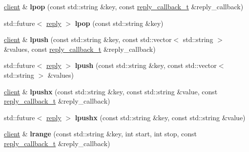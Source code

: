 \begin{DoxyCompactItemize}
\item 
\mbox{\label{classcpp__redis_1_1client_ad4060807b9b9aa330ad11dedd69e80b8}} 
\hyperlink{classcpp__redis_1_1client}{client} \& {\bfseries lpop} (const std\+::string \&key, const \hyperlink{classcpp__redis_1_1client_a061a1140d36d2eaeda82b09a0bb3f9f2}{reply\+\_\+callback\+\_\+t} \&reply\+\_\+callback)
\item 
\mbox{\label{classcpp__redis_1_1client_ab6ebbc7b2e6f43f2b5607a4b5471694e}} 
std\+::future$<$ \hyperlink{classcpp__redis_1_1reply}{reply} $>$ {\bfseries lpop} (const std\+::string \&key)
\item 
\mbox{\label{classcpp__redis_1_1client_a0dd04ea38709dd51ae5f39de62d01c70}} 
\hyperlink{classcpp__redis_1_1client}{client} \& {\bfseries lpush} (const std\+::string \&key, const std\+::vector$<$ std\+::string $>$ \&values, const \hyperlink{classcpp__redis_1_1client_a061a1140d36d2eaeda82b09a0bb3f9f2}{reply\+\_\+callback\+\_\+t} \&reply\+\_\+callback)
\item 
\mbox{\label{classcpp__redis_1_1client_ac5859a6b63200a4a79574187a7155feb}} 
std\+::future$<$ \hyperlink{classcpp__redis_1_1reply}{reply} $>$ {\bfseries lpush} (const std\+::string \&key, const std\+::vector$<$ std\+::string $>$ \&values)
\item 
\mbox{\label{classcpp__redis_1_1client_ab0a9a2b92f53f774ce4e345b42a403d0}} 
\hyperlink{classcpp__redis_1_1client}{client} \& {\bfseries lpushx} (const std\+::string \&key, const std\+::string \&value, const \hyperlink{classcpp__redis_1_1client_a061a1140d36d2eaeda82b09a0bb3f9f2}{reply\+\_\+callback\+\_\+t} \&reply\+\_\+callback)
\item 
\mbox{\label{classcpp__redis_1_1client_af9a3e05f5bd6d4ebb3138dc09f8d0d4e}} 
std\+::future$<$ \hyperlink{classcpp__redis_1_1reply}{reply} $>$ {\bfseries lpushx} (const std\+::string \&key, const std\+::string \&value)
\item 
\mbox{\label{classcpp__redis_1_1client_a9e85cce8555274f7bc706a13911b4579}} 
\hyperlink{classcpp__redis_1_1client}{client} \& {\bfseries lrange} (const std\+::string \&key, int start, int stop, const \hyperlink{classcpp__redis_1_1client_a061a1140d36d2eaeda82b09a0bb3f9f2}{reply\+\_\+callback\+\_\+t} \&reply\+\_\+callback)

\end{DoxyCompactItemize}

